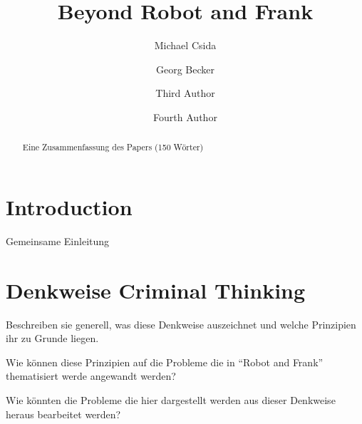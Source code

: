 \documentclass[sigchi-a, authorversion]{acmart}
\begin{document}
\title{Beyond Robot and Frank}

\author{Michael Csida}

\author{Georg Becker}

\author{Third Author}

\author{Fourth Author}

\renewcommand{\shortauthors}{F. Author et al.}

\maketitle

\begin{abstract}
    Eine Zusammenfassung des Papers (150 Wörter)

\end{abstract}

\section{Introduction}

Gemeinsame Einleitung



\section{Denkweise Criminal Thinking}

Beschreiben sie generell, was diese Denkweise auszeichnet und welche Prinzipien ihr zu Grunde liegen.

Wie können diese Prinzipien auf die Probleme die in ``Robot and Frank'' thematisiert werde angewandt werden?

Wie könnten die Probleme die hier dargestellt werden aus dieser Denkweise heraus bearbeitet werden?

\end{document}
